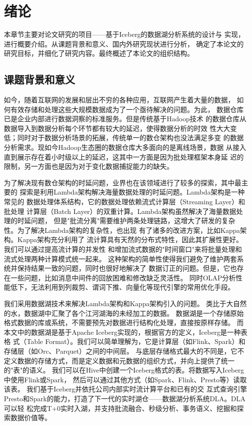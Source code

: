 
\chapter{绪论}

本章节主要对论文研究的项目——基于Iceberg的数据湖分析系统的设计与
实现，进行概要介绍。从课题背景和意义、国内外研究现状进行分析，
确定了本论文的研究目标，并细化了研究内容。最终概述了本论文的组织结构。

\section{课题背景和意义}

如今，随着互联网的发展和层出不穷的各种应用，互联网产生着大量的数据，
如何有效存储和处理这些大规模数据成为了一个亟待解决的问题\cite{1}。为此，
数据仓库已是企业内部进行数据洞察的标准服务。但是传统基于Hadoop技术\cite{2}
的数据仓库从数据导入到数据分析每个环节都有较大的延迟，使得数据分析的时效
性大大变低；同时对于数据分析场景的拓展，传统单一的数仓架构也没法满足多变
的数据分析需求。现如今Hadoop生态圈的数据仓库大多面向的是离线场景，数据
从接入直到展示存在着小时级以上的延迟，这其中一方面是因为批处理框架本身延
迟的限制，另一方面也是因为对于变化数据捕捉能力的缺失。

为了解决现有数仓架构的时延问题，业界也在该领域进行了较多的探索，其中最主要的
探索是利用Lambda架构\cite{3}解决海量数据处理的时延问题。Lambda架构是一种常见的
数据处理体系结构，它的数据处理依赖流式计算层（Streaming Layer）和批处理
计算层（Batch Layer）的双重计算。Lambda架构虽然解决了海量数据处理的时延问题，
但是"批流分离"需要维护两条处理链路，这增大了研发的复杂性。为了解决Lambda架构的复杂性，也出现
有了诸多的改进方案，比如Kappa架构\cite{4}。Kappa架构充分利用了
流计算具有天然的分布式特性，因此其扩展性更好。我们可以通过提高流计算的并发性
和增加流式数据的"时间窗口"来将批量处理和流式处理两种计算模式统一起来。
这种架构的简单性使得我们避免了维护两套系统并保持结果一致的问题，同时也很好地解决了
数据订正的问题。但是，它也存在一些问题，比如消息中间件的回放困难和修改缺乏灵活性。
同时OLAP分析性能低下，无法利用到列裁剪、谓词下推、向量化等现代引擎的常用优化手段。

我们采用数据湖技术来解决Lambda架构和Kappa架构引入的问题。
类比于大自然的水，数据湖中汇聚了各个江河湖海的未经加工的数据。
数据湖是一个存储原始格式数据的库或系统，不需要预先对数据进行结构化处理，直接按原样存储\cite{5,6,7,8}。
而本文中的数据湖是基于Apache Iceberg实现的，根据官方的定义，Iceberg是一种表格
式（Table Format）。我们可以简单理解为，它是计算层（如Flink、Spark）和存储层（如Orc\cite{9}、Parquet\cite{10}）之间的中间层。
与底层存储格式最大的不同是，它不定义数据的存储方式，而是定义数据和元数据的组织方式，并向上提供了统一的"表"的语义。
我们可以在Hive中创建一个Iceberg格式的表。将数据写入Iceberg中使用Flink或Spark，
然后可以通过其他方式（如Spark、Flink、Presto\cite{11}等）读取该表。
我们基于Iceberg并依托公司内部实时流计算平台和已有的交
互式查询引擎Presto和Spark的能力，打造了下一代的实时湖仓——数据湖分析系统DLA。DLA可以轻
松完成T+0实时入湖，并支持批流融合、秒级分析、事务语义、挖掘和探索数据价值等。

